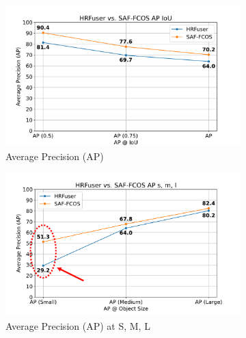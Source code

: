 \documentclass[report.tex]{subfiles}
\begin{document}
    \begin{figure}[h!]
        \centering
        \begin{subfigure}[b]{0.45\textwidth}
            \centering
            \includegraphics[width=\textwidth]{images/results/saf_vs_hrfuser/ap_iou.pdf}
            \caption{Average Precision (AP)}
            \label{fig:saf_vs_hrfuser_ap_iou}
        \end{subfigure}
        \hfill %
        \begin{subfigure}[b]{0.45\textwidth}
            \centering
            \includegraphics[width=\textwidth]{images/results/saf_vs_hrfuser/ap_sml_anno.pdf}
            \caption{Average Precision (AP) at S, M, L}
            \label{fig:saf_vs_hrfuser_ap_sml}
        \end{subfigure}
        \vspace{1em} %
        \begin{subfigure}[b]{0.45\textwidth}
            \centering

\end{subfigure}
\end{figure}
\end{document}
